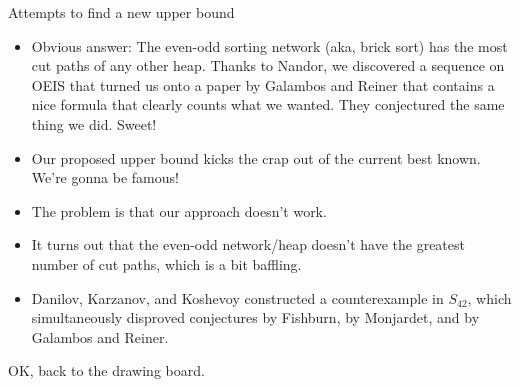 \documentclass[10pt, compress,aspectratio=169,handout]{beamer}
\begin{document}
\begin{frame}{Attempts to find a new upper bound}\pause

\vspace{1em}

\begin{itemize}

\item Obvious answer: The even-odd sorting network (aka, brick sort) has the most cut paths of any other heap. Thanks to Nandor, we discovered a sequence on OEIS that turned us onto a paper by Galambos and Reiner that contains a nice formula that clearly counts what we wanted. They conjectured the same thing we did. Sweet! \pause
\item Our proposed upper bound kicks the crap out of the current best known. We're gonna be famous! {\Large \alert{\textbf{\smiley{}}}} \pause
\item The problem is that our approach doesn't work. {\Large \alert{\textbf{\frownie{}}}} \pause
\item It turns out that the even-odd network/heap doesn't have the greatest number of cut paths, which is a bit baffling. \pause
\item Danilov, Karzanov, and Koshevoy constructed a counterexample in $S_{42}$, which simultaneously disproved conjectures by Fishburn, by Monjardet, and by Galambos and Reiner.
\end{itemize}

\vspace{-.5em} \pause

\begin{center}
OK, back to the drawing board.
\end{center}

\end{frame}

\end{document}
